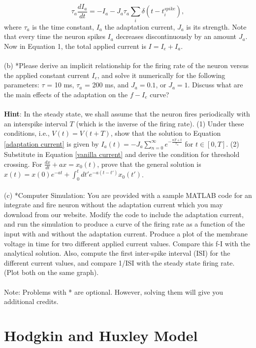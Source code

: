 \documentclass{article}
\begin{document}
\begin{equation}
\label{adaptation current}
\tau_a \frac{dI_a}{dt}=-I_a - J_a\tau_a\sum_i\delta(t-t^{spike}_{i}), 
\end{equation}
where $\tau_a$ is the time constant, $I_a$ the adaptation current, $J_a$ is its strength. Note that every time the neuron spikes $I_a$ decreases discontinuously by an amount $J_a$. Now in Equation 1,  the total applied current is $I=I_e+I_a$.
\\
\\
(b) *Please derive an implicit relationship for the firing rate of the neuron versus the applied constant current $I_e$, and solve it numerically for the following parameters: $\tau$ = 10 ms, $\tau_a$ = 200 ms, and $J_a =0.1$, or $J_a = 1$. Discuss what are the main effects of the adaptation on the $f-I_e$ curve?
\\
\\
\textbf{Hint}: In the steady state, we shall assume that the neuron fires periodically with an interspike interval $T$ (which is the inverse of the firing rate). (1) Under these conditions, i.e., $V(t)=V(t+T)$, show that the solution to Equation \ref{adaptation current} is given by $I_a(t)=-J_a\sum_{n=0}^{\infty} e^{-\frac{nT+t}{\tau_a}}$ for $t \in [0, T]$. (2) Substitute in Equation \ref{vanilla current} and derive the condition for threshold crossing. For $\frac{dx}{dt}+ax=x_0(t)$, prove that the general solution is $x(t)=x(0)e^{-at}+\int_{0}^{t}dt'e^{-a(t-t')}x_0(t')$. 
\\
\\
(c) *Computer Simulation: You are provided with a sample MATLAB code for an integrate and fire neuron without the adaptation current which you may download from our website. Modify the code to include the adaptation current, and run the simulation to produce a curve of the firing rate as a function of the input with and without the adaptation current. Produce a plot of the membrane voltage in time for two different applied current values. Compare this f-I with the analytical solution. Also, compute the first inter-spike interval (ISI) for the different current values, and compare 1/ISI with the steady state firing rate. (Plot both on the same graph).
\\
\\
Note: Problems with * are optional. However, solving them will give you additional credits.


\section*{Hodgkin and Huxley Model}
\end{document}
